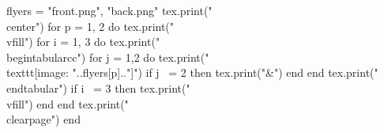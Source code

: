 \documentclass[letterpaper,10pt]{article}
\begin{document}
\begin{luacode}
    flyers = {"front.png", "back.png"}
    tex.print("\\center")
    for p = 1, 2 do 
    tex.print(" \\vfill")
        for i = 1, 3 do
            tex.print("\\begin{tabular}{cc}")
            for j = 1,2 do 
                tex.print("\\texttt{[image: "..flyers[p].."]}")
                if j ~= 2 then
                    tex.print("&")
                end
            end
            tex.print("\\end{tabular}")            
            if i ~= 3 then
                tex.print("\\vfill")
            end
        end
        tex.print("\\clearpage")
    end
\end{luacode}
\end{document}
